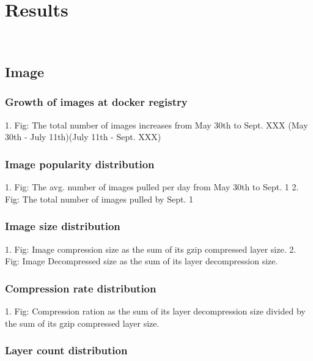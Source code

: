 
\section{Results}

\\

\subsection{Image}

\subsubsection{Growth  of images at docker registry}

1. Fig: The total number of images increases from May 30th to Sept. XXX (May 30th - July 11th)(July 11th - Sept. XXX)

\subsubsection{Image popularity distribution}

1. Fig: The avg. number of images pulled per day from May 30th to Sept. 1
2. Fig: The total number of images pulled by Sept. 1

\subsubsection{Image size distribution}

1. Fig: Image compression size as the sum of its gzip compressed layer size.
2. Fig: Image Decompressed size as the sum of its layer decompression size.


\subsubsection{Compression rate distribution}

1. Fig: Compression ration as the sum of its layer decompression size divided by the sum of its gzip compressed layer size.

\subsubsection{Layer count distribution}

